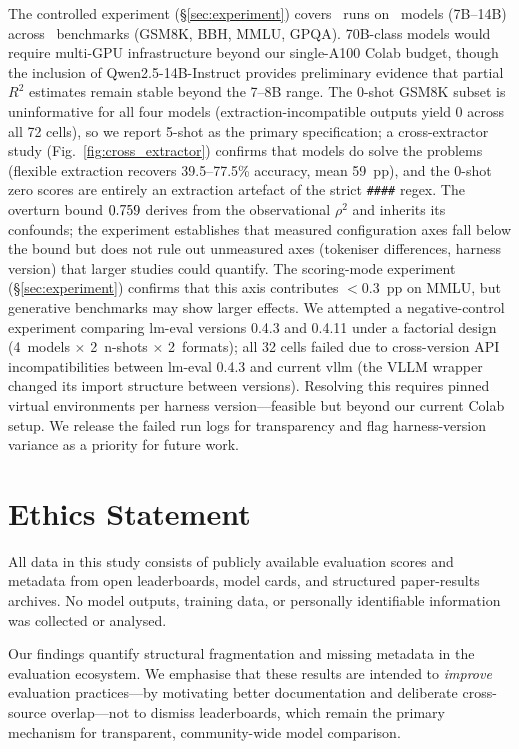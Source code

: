 \documentclass[11pt]{article}
\begin{document}
The controlled experiment (\S\ref{sec:experiment}) covers
\expruns{}~runs on \expmodels{}~models (7B--14B) across
\expbenches{}~benchmarks (GSM8K, BBH, MMLU, GPQA).
70B-class models would require multi-GPU
infrastructure beyond our single-A100 Colab budget, though the
inclusion of Qwen2.5-14B-Instruct provides preliminary evidence
that partial~$R^2$ estimates remain stable beyond the 7--8B range. The 0-shot
GSM8K subset is uninformative for all four models
(extraction-incompatible outputs yield 0 across all 72 cells), so we report 5-shot as
the primary specification; a cross-extractor study
(Fig.~\ref{fig:cross_extractor}) confirms that models do solve
the problems (flexible extraction recovers 39.5--77.5\% accuracy,
mean 59~pp), and the 0-shot zero scores are entirely an
extraction artefact of the strict \texttt{\#\#\#\#} regex. The overturn bound $0.759{}$
derives from the observational $\rho^2$ and inherits its
confounds; the experiment establishes that measured configuration
axes fall below the bound but does not rule out unmeasured axes
(tokeniser differences, harness version) that
larger studies could quantify. The scoring-mode experiment
(\S\ref{sec:experiment}) confirms that this axis contributes
${<}$0.3~pp on MMLU, but generative benchmarks may show larger
effects. We attempted a negative-control
experiment comparing lm-eval versions 0.4.3 and 0.4.11 under a
factorial design (4~models $\times$ 2~n-shots $\times$
2~formats); all 32 cells failed due to cross-version API
incompatibilities between lm-eval 0.4.3 and current vllm
(the VLLM wrapper changed its import structure between
versions). Resolving this requires pinned virtual environments
per harness version---feasible but beyond our current Colab
setup. We release the failed run logs for transparency and
flag harness-version variance as a priority for future work.

\section*{Ethics Statement}

All data in this study consists of publicly available evaluation
scores and metadata from open leaderboards, model cards, and
structured paper-results archives. No model outputs, training
data, or personally identifiable information was collected or
analysed.

Our findings quantify structural fragmentation and missing
metadata in the evaluation ecosystem. We emphasise that these
results are intended to \emph{improve} evaluation
practices---by motivating better documentation and deliberate
cross-source overlap---not to dismiss leaderboards, which remain
the primary mechanism for transparent, community-wide model
comparison.
\end{document}
